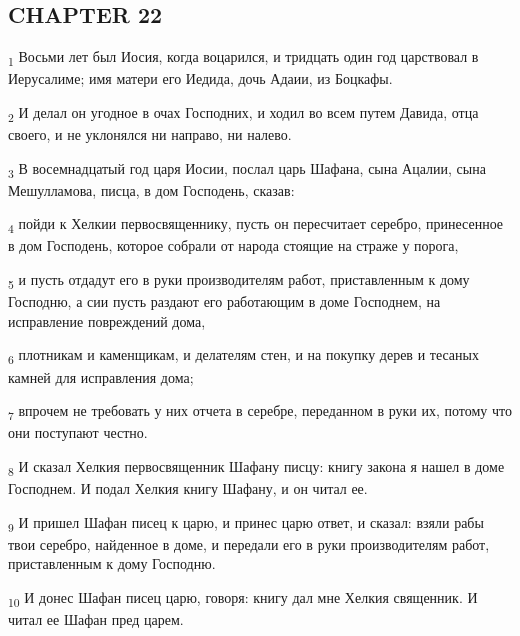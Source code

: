 \subsection{CHAPTER 22}
\begin{tcolorbox}
\textsubscript{1} Восьми лет был Иосия, когда воцарился, и тридцать один год царствовал в Иерусалиме; имя матери его Иедида, дочь Адаии, из Боцкафы.
\end{tcolorbox}
\begin{tcolorbox}
\textsubscript{2} И делал он угодное в очах Господних, и ходил во всем путем Давида, отца своего, и не уклонялся ни направо, ни налево.
\end{tcolorbox}
\begin{tcolorbox}
\textsubscript{3} В восемнадцатый год царя Иосии, послал царь Шафана, сына Ацалии, сына Мешулламова, писца, в дом Господень, сказав:
\end{tcolorbox}
\begin{tcolorbox}
\textsubscript{4} пойди к Хелкии первосвященнику, пусть он пересчитает серебро, принесенное в дом Господень, которое собрали от народа стоящие на страже у порога,
\end{tcolorbox}
\begin{tcolorbox}
\textsubscript{5} и пусть отдадут его в руки производителям работ, приставленным к дому Господню, а сии пусть раздают его работающим в доме Господнем, на исправление повреждений дома,
\end{tcolorbox}
\begin{tcolorbox}
\textsubscript{6} плотникам и каменщикам, и делателям стен, и на покупку дерев и тесаных камней для исправления дома;
\end{tcolorbox}
\begin{tcolorbox}
\textsubscript{7} впрочем не требовать у них отчета в серебре, переданном в руки их, потому что они поступают честно.
\end{tcolorbox}
\begin{tcolorbox}
\textsubscript{8} И сказал Хелкия первосвященник Шафану писцу: книгу закона я нашел в доме Господнем. И подал Хелкия книгу Шафану, и он читал ее.
\end{tcolorbox}
\begin{tcolorbox}
\textsubscript{9} И пришел Шафан писец к царю, и принес царю ответ, и сказал: взяли рабы твои серебро, найденное в доме, и передали его в руки производителям работ, приставленным к дому Господню.
\end{tcolorbox}
\begin{tcolorbox}
\textsubscript{10} И донес Шафан писец царю, говоря: книгу дал мне Хелкия священник. И читал ее Шафан пред царем.
\end{tcolorbox}
